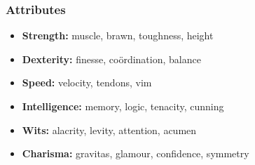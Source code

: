 \subsubsection*{Attributes}

\begin{itemize}
  \item
  \textbf{Strength:} muscle, brawn, toughness, height
  \item
  \textbf{Dexterity:} finesse, coördination, balance
  \item
  \textbf{Speed:} velocity, tendons, vim
  \item
  \textbf{Intelligence:} memory, logic, tenacity, cunning
  \item
  \textbf{Wits:} alacrity, levity, attention, acumen
  \item
  \textbf{Charisma:} gravitas, glamour, confidence, symmetry
\end{itemize}


